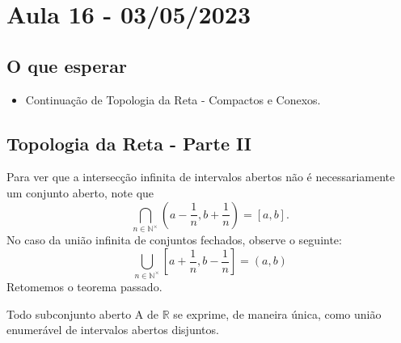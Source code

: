 \documentclass[analysis_notes.tex]{subfiles}
\begin{document}
\section{Aula 16 - 03/05/2023}
\subsection{O que esperar}
\begin{itemize}
	\item Continua\c c\~ao de Topologia da Reta - Compactos e Conexos.
\end{itemize}
\subsection{Topologia da Reta - Parte II}
Para ver que a intersec\c c\~ao infinita de intervalos abertos n\~ao \'e necessariamente um conjunto aberto, note que
\[
	\bigcap_{n\in \mathbb{N}^{\times}}^{}{(a-\frac{1}{n}, b+\frac{1}{n})} = [a, b].
\]
No caso da uni\~ao infinita de conjuntos fechados, observe o seguinte:
$$
	\bigcup_{n\in \mathbb{N}^{\times}}^{}{[a+\frac{1}{n}, b - \frac{1}{n}]}=(a, b)
$$
Retomemos o teorema passado.
\begin{theorem*}
	Todo subconjunto aberto A de $\mathbb{R}$ se exprime, de maneira \'unica, como uni\~ao enumer\'avel de intervalos abertos disjuntos.
\end{theorem*}
\end{document}
